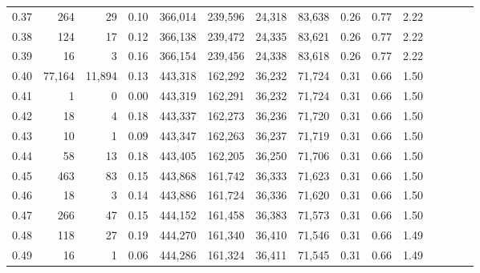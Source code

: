 \begin{tabular}{rrrcrrrrrrrrrrr}
0.37 &     264 &      29 &                                       0.10 &  366,014 &  239,596 &   24,318 &   83,638 &  0.26 &  0.77 &                         2.22 \\
0.38 &     124 &      17 &                                       0.12 &  366,138 &  239,472 &   24,335 &   83,621 &  0.26 &  0.77 &                         2.22 \\
0.39 &      16 &       3 &                                       0.16 &  366,154 &  239,456 &   24,338 &   83,618 &  0.26 &  0.77 &                         2.22 \\
0.40 &  77,164 &  11,894 &                                       0.13 &  443,318 &  162,292 &   36,232 &   71,724 &  0.31 &  0.66 &                         1.50 \\
0.41 &       1 &       0 &                                       0.00 &  443,319 &  162,291 &   36,232 &   71,724 &  0.31 &  0.66 &                         1.50 \\
0.42 &      18 &       4 &                                       0.18 &  443,337 &  162,273 &   36,236 &   71,720 &  0.31 &  0.66 &                         1.50 \\
0.43 &      10 &       1 &                                       0.09 &  443,347 &  162,263 &   36,237 &   71,719 &  0.31 &  0.66 &                         1.50 \\
0.44 &      58 &      13 &                                       0.18 &  443,405 &  162,205 &   36,250 &   71,706 &  0.31 &  0.66 &                         1.50 \\
0.45 &     463 &      83 &                                       0.15 &  443,868 &  161,742 &   36,333 &   71,623 &  0.31 &  0.66 &                         1.50 \\
0.46 &      18 &       3 &                                       0.14 &  443,886 &  161,724 &   36,336 &   71,620 &  0.31 &  0.66 &                         1.50 \\
0.47 &     266 &      47 &                                       0.15 &  444,152 &  161,458 &   36,383 &   71,573 &  0.31 &  0.66 &                         1.50 \\
0.48 &     118 &      27 &                                       0.19 &  444,270 &  161,340 &   36,410 &   71,546 &  0.31 &  0.66 &                         1.49 \\
0.49 &      16 &       1 &                                       0.06 &  444,286 &  161,324 &   36,411 &   71,545 &  0.31 &  0.66 &                         1.49 \\

\end{tabular}
